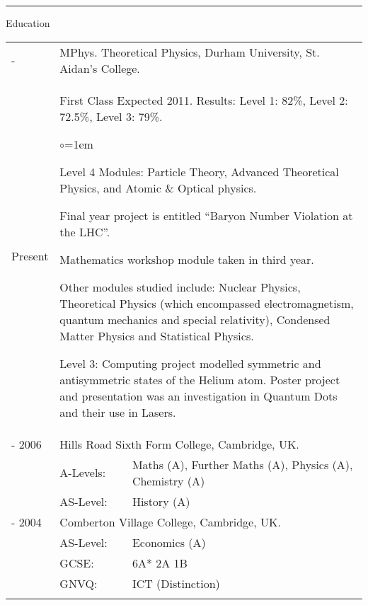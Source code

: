 \documentclass[11pt,a4paper]{article}
\makeatletter
\renewcommand{\labelitemi}{$\circ$}
\newcommand{\wa}{.12}	%
\newcommand{\wb}{.83}	%
\newenvironment{tablehere}
	{\def\@captype{table}}
	{}
\makeatother
\begin{document}
\vspace{0.2cm}\hrule\vspace{0.2cm}
\sc Education \rm


\begin{tablehere}
\begin{tabular}{p{\wa\textwidth} p{2cm} l}
\sc2007 -		&	\multicolumn{2}{p{\wb\textwidth}}{ \sc MPhys$.$ Theoretical Physics, Durham University, St$.$ Aidan's College.}\\
\sc Present	&	\multicolumn{2}{p{\wb\textwidth}}{{\sc First Class Expected 2011.}  Results: Level 1: 82\%, Level 2: 72.5\%, Level 3: 79\%.
				\begin{list}{\labelitemi}{\leftmargin=1em}
				\item Level 4 Modules: Particle Theory, Advanced Theoretical Physics, and Atomic \& Optical physics. 
				\item Final year project is entitled ``Baryon Number Violation at the LHC''.
				\item Mathematics workshop module taken in third year.
				\item Other modules studied include: Nuclear Physics, Theoretical Physics (which encompassed electromagnetism, quantum mechanics  and special relativity), Condensed Matter Physics and Statistical Physics.
				\item Level 3: Computing project modelled symmetric and antisymmetric states of the Helium atom.  Poster project and presentation was an investigation in Quantum Dots and their use in Lasers.
				\end{list} }\\
								

\sc2004 - 2006	&	\multicolumn{2}{p{\wb\textwidth}}{\sc Hills Road Sixth Form College, Cambridge, UK.}	\\
			&	\sc A-Levels: 	&\rm Maths (A), Further Maths (A), Physics (A), Chemistry (A)			\\
			&	\sc AS-Level:	&\rm History (A)											\\
\sc1999 - 2004	&	\multicolumn{2}{p{\wb\textwidth}}{\sc Comberton Village College, Cambridge, UK.}		\\
			&	\sc AS-Level:	& \rm Economics (A)											\\
			&	\sc GCSE:		& 6A* 2A 1B												\\
			&	\sc GNVQ:	& ICT (Distinction)											\\\\
\end{tabular}
\end{tablehere}
\end{document}
